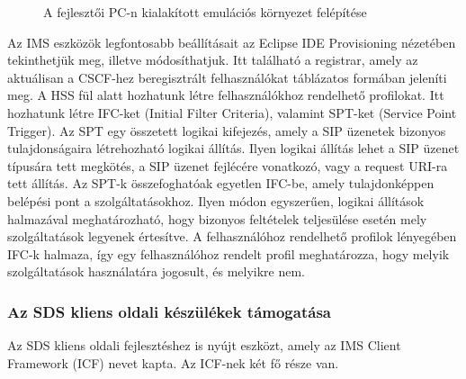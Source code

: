 \begin{figure}[htbp]
\center
{}
\caption{A fejlesztői PC-n kialakított emulációs környezet felépítése~\cite{sds_tech_desc}}
\label{fig:sds_env}
\end{figure}

Az IMS eszközök legfontosabb beállításait az Eclipse IDE Provisioning nézetében tekinthetjük meg, illetve módosíthatjuk. Itt található a registrar, amely az aktuálisan a CSCF-hez beregisztrált felhasználókat táblázatos formában jeleníti meg. A HSS fül alatt hozhatunk létre felhasználókhoz rendelhető profilokat. Itt hozhatunk létre IFC-ket (Initial Filter Criteria), valamint SPT-ket (Service Point Trigger). Az SPT egy összetett logikai kifejezés, amely a SIP üzenetek bizonyos tulajdonságaira létrehozható logikai állítás. Ilyen logikai állítás lehet a SIP üzenet típusára tett megkötés, a SIP üzenet fejlécére vonatkozó, vagy a request URI-ra tett állítás. Az SPT-k összefoghatóak egyetlen IFC-be, amely tulajdonképpen belépési pont a szolgáltatásokhoz. Ilyen módon egyszerűen, logikai állítások halmazával meghatározható, hogy bizonyos feltételek teljesülése esetén mely szolgáltatások legyenek értesítve. A felhasználóhoz rendelhető profilok lényegében IFC-k halmaza, így egy felhasználóhoz rendelt profil meghatározza, hogy melyik szolgáltatások használatára jogosult, és melyikre nem. 

\subsubsection{Az SDS kliens oldali készülékek támogatása}

Az SDS kliens oldali fejlesztéshez is nyújt eszközt, amely az IMS Client Framework (ICF) nevet kapta. Az ICF-nek két fő része van. 

